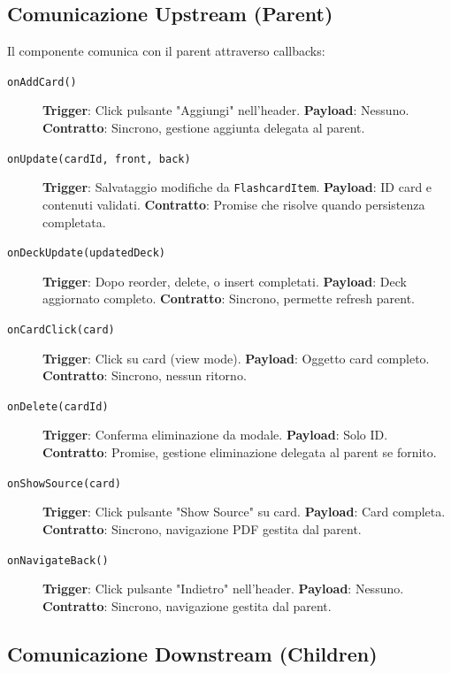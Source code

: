 \documentclass[11pt,a4paper]{article}
\begin{document}
\subsection{Comunicazione Upstream (Parent)}

Il componente comunica con il parent attraverso callbacks:

\begin{description}
    \item[\texttt{onAddCard()}] \textbf{Trigger}: Click pulsante "Aggiungi" nell'header. \textbf{Payload}: Nessuno. \textbf{Contratto}: Sincrono, gestione aggiunta delegata al parent.
    
    \item[\texttt{onUpdate(cardId, front, back)}] \textbf{Trigger}: Salvataggio modifiche da \texttt{FlashcardItem}. \textbf{Payload}: ID card e contenuti validati. \textbf{Contratto}: Promise che risolve quando persistenza completata.
    
    \item[\texttt{onDeckUpdate(updatedDeck)}] \textbf{Trigger}: Dopo reorder, delete, o insert completati. \textbf{Payload}: Deck aggiornato completo. \textbf{Contratto}: Sincrono, permette refresh parent.
    
    \item[\texttt{onCardClick(card)}] \textbf{Trigger}: Click su card (view mode). \textbf{Payload}: Oggetto card completo. \textbf{Contratto}: Sincrono, nessun ritorno.
    
    \item[\texttt{onDelete(cardId)}] \textbf{Trigger}: Conferma eliminazione da modale. \textbf{Payload}: Solo ID. \textbf{Contratto}: Promise, gestione eliminazione delegata al parent se fornito.
    
    \item[\texttt{onShowSource(card)}] \textbf{Trigger}: Click pulsante "Show Source" su card. \textbf{Payload}: Card completa. \textbf{Contratto}: Sincrono, navigazione PDF gestita dal parent.
    
    \item[\texttt{onNavigateBack()}] \textbf{Trigger}: Click pulsante "Indietro" nell'header. \textbf{Payload}: Nessuno. \textbf{Contratto}: Sincrono, navigazione gestita dal parent.
\end{description}

\subsection{Comunicazione Downstream (Children)}
\end{document}
